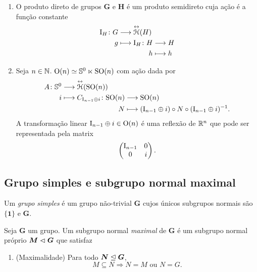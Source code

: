\begin{example}
	\begin{enumerate}
		\item O produto direto de grupos $\bm G$ e $\bm H$ é um produto semidireto cuja ação é a função constante
	\begin{align*}
		\func{\Id_H}{G}{\Iso{\Homo}(H)}{g}{
			\begin{aligned}[t]
				\func{\Id_H}{H}{H}{h}{h}
			\end{aligned}
		}
	\end{align*}

	\item Seja $n \in \mathbb{N}$. $\operatorname{O}(n) \simeq \mathbb{S}^0 \ltimes \operatorname{SO}(n)$ com ação dada por
		\begin{align*}
			\func{A}{\S^0}{\Aut(\SO(n))}{i}{
				\begin{aligned}[t]
					\func{C_{\Id_{n-1} \oplus i}}{\SO(n)}{\SO(n)}{N}{(\Id_{n-1} \oplus i) \circ N \circ (\Id_{n-1} \oplus i)\inv}.
				\end{aligned}
			}
		\end{align*}
	A transformação linear $\mathrm{I}_{n-1} \oplus i \in \operatorname{O}(n)$ é uma reflexão de $\mathbb{R}^n$ que pode ser representada pela matrix
		\begin{equation*}
			\begin{pmatrix}
				\mathrm{I}_{n-1}	&	0 \\
				0			&	i
			\end{pmatrix}.
		\end{equation*}
	\end{enumerate}
\end{example}













\subsection{Grupo simples e subgrupo normal maximal}

\begin{definition}
Um \emph{grupo simples} é um grupo não-trivial $\bm G$ cujos únicos subgrupos normais são $\bm{\{1\}}$ e $\bm G$.
\end{definition}

\begin{definition}
Seja $\bm G$ um grupo. Um subgrupo normal \emph{maximal} de $\bm G$ é um subgrupo normal próprio $\bm M \mathrel{\lhd} \bm G$ que satisfaz
	\begin{enumerate}
	\item (Maximalidade) Para todo $\bm N \mathrel{\unlhd} \bm G$,
		\begin{equation*}
		M \subseteq N \Rightarrow N = M \text{\ \ ou\ \ } N = G.
		\end{equation*}
	\end{enumerate}
\end{definition}


